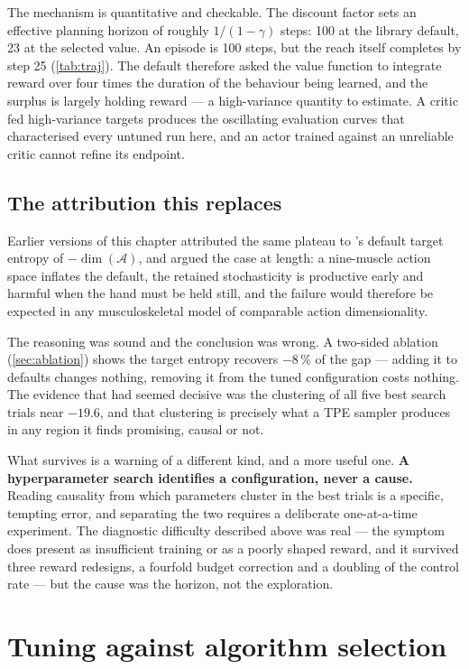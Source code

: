 The mechanism is quantitative and checkable. The discount factor sets an
effective planning horizon of roughly $1/(1-\gamma)$ steps: 100 at the library
default, 23 at the selected value. An episode is 100 steps, but the reach itself
completes by step 25 (\cref{tab:traj}). The default therefore asked the value
function to integrate reward over four times the duration of the behaviour being
learned, and the surplus is largely holding reward --- a high-variance quantity to
estimate. A critic fed high-variance targets produces the oscillating evaluation
curves that characterised every untuned run here, and an actor trained against an
unreliable critic cannot refine its endpoint.

\subsection*{The attribution this replaces}

Earlier versions of this chapter attributed the same plateau to \SAC's default
target entropy of $-\dim(\mathcal{A})$, and argued the case at length: a
nine-muscle action space inflates the default, the retained stochasticity is
productive early and harmful when the hand must be held still, and the failure
would therefore be expected in any musculoskeletal model of comparable action
dimensionality.

The reasoning was sound and the conclusion was wrong. A two-sided ablation
(\cref{sec:ablation}) shows the target entropy recovers $-8$\,\% of the gap ---
adding it to defaults changes nothing, removing it from the tuned configuration
costs nothing. The evidence that had seemed decisive was the clustering of all
five best search trials near $-19.6$, and that clustering is precisely what a TPE
sampler produces in any region it finds promising, causal or not.

What survives is a warning of a different kind, and a more useful one. \textbf{A
hyperparameter search identifies a configuration, never a cause.} Reading
causality from which parameters cluster in the best trials is a specific,
tempting error, and separating the two requires a deliberate one-at-a-time
experiment. The diagnostic difficulty described above was real --- the symptom
does present as insufficient training or as a poorly shaped reward, and it
survived three reward redesigns, a fourfold budget correction and a doubling of
the control rate --- but the cause was the horizon, not the exploration.

\section{Tuning against algorithm selection}

